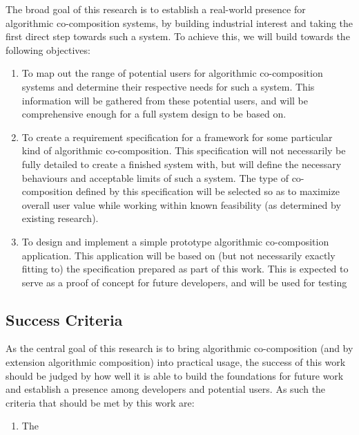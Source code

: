 \documentclass[11pt]{article}
\begin{document}
	The broad goal of this research is to establish a real-world presence for algorithmic co-composition systems, by building industrial interest and taking the first direct step towards such a system. To achieve this, we will build towards the following objectives:
	\begin{enumerate}
		\item To map out the range of potential users for algorithmic co-composition systems and determine their respective needs for such a system. This information will be gathered from these potential users, and will be comprehensive enough for a full system design to be based on.
		\item To create a requirement specification for a framework for some particular kind of algorithmic co-composition. This specification will not necessarily be fully detailed to create a finished system with, but will define the necessary behaviours and acceptable limits of such a system. The type of co-composition defined by this specification will be selected so as to maximize overall user value while working within known feasibility (as determined by existing research).
		\item To design and implement a simple prototype algorithmic co-composition application. This application will be based on (but not necessarily exactly fitting to) the specification prepared as part of this work. This is expected to serve as a proof of concept for future developers, and will be used for testing 
		
	\end{enumerate}
		
	\subsection{Success Criteria}
	
	As the central goal of this research is to bring algorithmic co-composition (and by extension algorithmic composition) into practical usage, the success of this work should be judged by how well it is able to build the foundations for future work and establish a presence among developers and potential users. As such the criteria that should be met by this work are:
	\begin{enumerate}
		\item The 
	\end{enumerate}
	
\end{document}
